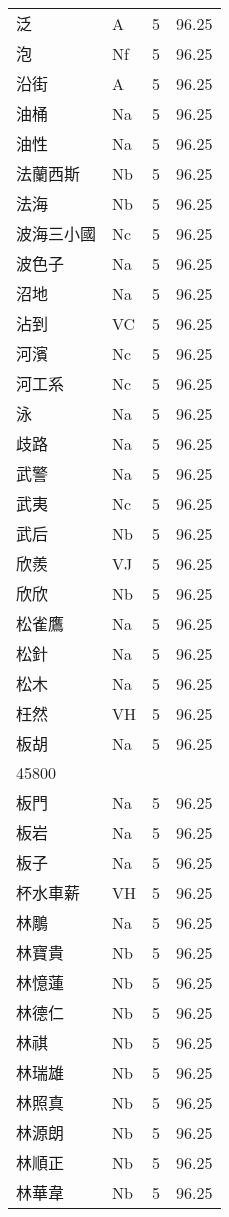 \documentclass[twocolumn]{book}
\begin{document}
\begin{supertabular}{llrr}
泛 & A & 5 &  96.25\\
泡 & Nf & 5 &  96.25\\
沿街 & A & 5 &  96.25\\
油桶 & Na & 5 &  96.25\\
油性 & Na & 5 &  96.25\\
法蘭西斯 & Nb & 5 &  96.25\\
法海 & Nb & 5 &  96.25\\
波海三小國 & Nc & 5 &  96.25\\
波色子 & Na & 5 &  96.25\\
沼地 & Na & 5 &  96.25\\
沾到 & VC & 5 &  96.25\\
河濱 & Nc & 5 &  96.25\\
河工系 & Nc & 5 &  96.25\\
泳 & Na & 5 &  96.25\\
歧路 & Na & 5 &  96.25\\
武警 & Na & 5 &  96.25\\
武夷 & Nc & 5 &  96.25\\
武后 & Nb & 5 &  96.25\\
欣羨 & VJ & 5 &  96.25\\
欣欣 & Nb & 5 &  96.25\\
松雀鷹 & Na & 5 &  96.25\\
松針 & Na & 5 &  96.25\\
松木 & Na & 5 &  96.25\\
枉然 & VH & 5 &  96.25\\
板胡 & Na & 5 &  96.25\\
45800\\
板門 & Na & 5 &  96.25\\
板岩 & Na & 5 &  96.25\\
板子 & Na & 5 &  96.25\\
杯水車薪 & VH & 5 &  96.25\\
林鵰 & Na & 5 &  96.25\\
林寶貴 & Nb & 5 &  96.25\\
林憶蓮 & Nb & 5 &  96.25\\
林德仁 & Nb & 5 &  96.25\\
林祺 & Nb & 5 &  96.25\\
林瑞雄 & Nb & 5 &  96.25\\
林照真 & Nb & 5 &  96.25\\
林源朗 & Nb & 5 &  96.25\\
林順正 & Nb & 5 &  96.25\\
林華韋 & Nb & 5 &  96.25\\

\end{supertabular}
\end{document}
